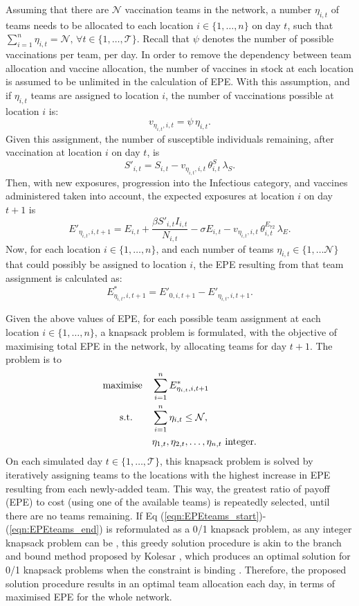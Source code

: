 \documentclass[10pt,letterpaper]{article}
\begin{document}
Assuming that there are $\mathcal{N}$ vaccination teams in the network, a number $\eta_{i,t}$ of teams needs to be allocated to each location $i \in \{1, \dots, n\}$ on day $t$, such that $\sum_{i=1}^{n} \eta_{i,t} = \mathcal{N}, \, \forall{t} \in \{1, \dots, \mathcal{T}\}$.
Recall that $\psi$ denotes the number of possible vaccinations per team, per day. In order to remove the dependency between team allocation and vaccine allocation, the number of vaccines in stock at each location is assumed to be unlimited in the calculation of EPE. With this assumption, and if $\eta_{i,t}$ teams are assigned to location $i$, the number of vaccinations possible at location $i$ is: $$v_{\eta_{i,t},i,t}  = \psi \,\eta_{i,t}.$$ 
Given this assignment, the number of susceptible individuals remaining, after vaccination at location $i$ on day $t$, is $$S'_{i,t} = S_{i,t} - v_{\eta_{i,t},i,t} \, \theta^{S}_{i,t} \, \lambda_{S}.$$
Then, with new exposures, progression into the Infectious category, and vaccines administered taken into account, the expected exposures at location $i$ on day $t+1$ is $$E'_{\eta_{i,t},i,t+1} = E_{i,t} + \frac{\beta S'_{i,t} I_{i,t}}{N_{i,t}} - \sigma E_{i,t} - v_{\eta_{i,t},i,t} \, \theta^{E_{72}}_{i,t} \, \lambda_{E}.$$
Now, for each location $i \in \{1,\dots,n\}$, and each number of teams $\eta_{i,t} \in \{1,\dots \mathcal{N}\}$ that could possibly be assigned to location $i$, the EPE resulting from that team assignment is calculated as:
$$E^{*}_{\eta_{i,t},i,t+1} = E'_{0,i,t+1} - E'_{\eta_{i,t},i,t+1}.$$

Given the above values of EPE, for each possible team assignment at each location $i \in \{1,\dots,n\}$, a knapsack problem is formulated, with the objective of maximising total EPE in the network, by allocating teams for day $t+1$. The problem is to
\begin{align}
\label{eqn:EPEteams_start}
    \text{maximise\quad} & \sum^{n}_{i=1} E^{*}_{\eta_{i,t},i,t+1} \\ 
    \text{s.t.\qquad} & \sum^{n}_{i=1} \eta_{i,t} \leq \mathcal{N}, \\
\label{eqn:EPEteams_end}
    &\eta_{1,t}, \eta_{2,t}, \ldots, \eta_{n,t} \text{ integer}.
\end{align}
On each simulated day $t \in \{1,\dots,\mathcal{T}\}$, this knapsack problem is solved by iteratively assigning teams to the locations with the highest increase in EPE resulting from each newly-added team. This way, the greatest ratio of payoff (EPE) to cost (using one of the available teams) is repeatedly selected, until there are no teams remaining. If Eq  (\ref{eqn:EPEteams_start})-(\ref{eqn:EPEteams_end}) is reformulated as a 0/1 knapsack problem, as any integer knapsack problem can be \cite[p.~524]{winston2004operations}, this greedy solution procedure is akin to the branch and bound method proposed by Kolesar \cite{kolesar1967branch}, which produces an optimal solution for 0/1 knapsack problems when the constraint is binding \cite{avis_2002}. Therefore, the proposed solution procedure results in an optimal team allocation each day, in terms of maximised EPE for the whole network. 
\end{document}
